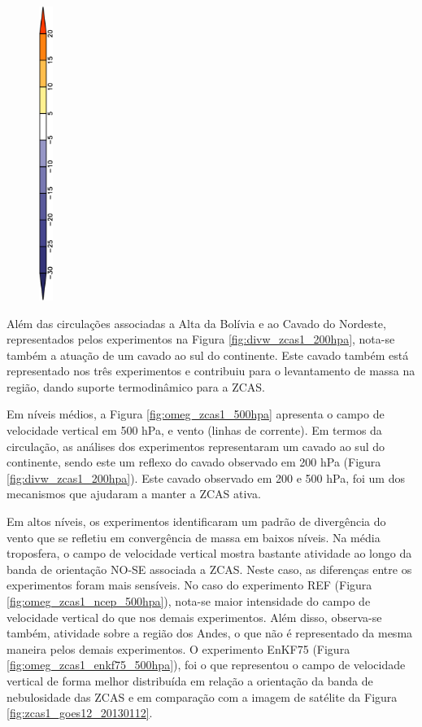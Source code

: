 \begin{figure}[H]
\begin{center}
{        } \\
        \includegraphics[width=0.04\textwidth,angle=-90]{./figs/cap5/estudo_zcas/cbar/cbar_divumi-crop.pdf}    
    \end{center}
    \vspace{2mm}
    \legenda{}
    \label{fig:divumi_zcas1_850hpa}
\end{figure}

Além das circulações associadas a Alta da Bolívia e ao Cavado do Nordeste, representados pelos experimentos na Figura \ref{fig:divw_zcas1_200hpa}, nota-se também a atuação de um cavado ao sul do continente. Este cavado também está representado nos três experimentos e contribuiu para o levantamento de massa na região, dando suporte termodinâmico para a ZCAS.

Em níveis médios, a Figura \ref{fig:omeg_zcas1_500hpa} apresenta o campo de velocidade vertical em 500 hPa, e vento (linhas de corrente). Em termos da circulação, as análises dos experimentos representaram um cavado ao sul do continente, sendo este um reflexo do cavado observado em 200 hPa (Figura \ref{fig:divw_zcas1_200hpa}). Este cavado observado em 200 e 500 hPa, foi um dos mecanismos que ajudaram a manter a ZCAS ativa.

Em altos níveis, os experimentos identificaram um padrão de divergência do vento que se refletiu em convergência de massa em baixos níveis. Na média troposfera, o campo de velocidade vertical mostra bastante atividade ao longo da banda de orientação NO-SE associada a ZCAS. Neste caso, as diferenças entre os experimentos foram mais sensíveis. No caso do experimento REF (Figura \ref{fig:omeg_zcas1_ncep_500hpa}), nota-se maior intensidade do campo de velocidade vertical do que nos demais experimentos. Além disso, observa-se também, atividade sobre a região dos Andes, o que não é representado da mesma maneira pelos demais experimentos. O experimento EnKF75 (Figura \ref{fig:omeg_zcas1_enkf75_500hpa}), foi o que representou o campo de velocidade vertical de forma melhor distribuída em relação a orientação da banda de nebulosidade das ZCAS e em comparação com a imagem de satélite da Figura \ref{fig:zcas1_goes12_20130112}.

